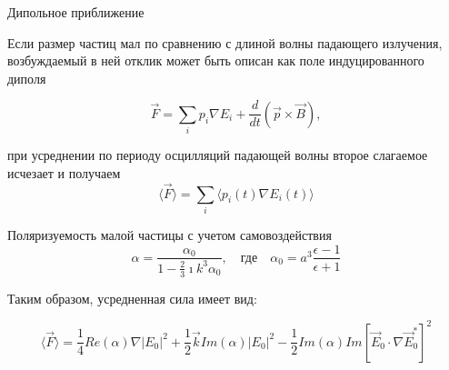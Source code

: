 \documentclass[9pt, compress, xcolor=table]{beamer}
\begin{document}
\begin{frame}{Дипольное приближение}

Если размер частиц мал по сравнению с длиной волны падающего излучения, возбуждаемый в ней отклик может быть описан как поле индуцированного диполя 

\begin{equation*}
\vec  F =\sum_i p_i \nabla E_i+\frac{d}{dt} (\vec p \times \vec B),
\end{equation*}

при усреднении по периоду осцилляций падающей волны второе слагаемое исчезает и получаем 
\begin{equation*}
\langle\vec  F \rangle= \sum_i \langle p_i(t) \nabla E_i(t) \rangle
\end{equation*}

Поляризуемость малой частицы с учетом самовоздействия
\begin{equation*}
\alpha=\frac{\alpha_0}{1-\frac{2}{3}\imath k^3\alpha_0},\quad\text{где}\quad\alpha_0 = a^3\frac{\epsilon-1}{\epsilon+1}
\end{equation*}

Таким образом, усредненная сила имеет вид:

\begin{equation*}
\boxed{
\langle\vec  F \rangle = \frac{1}{4} Re(\alpha) \nabla \left| E_0 \right|^2+\frac{1}{2} \vec k Im(\alpha) \left| E_0 \right|^2-\frac{1}{2} Im(\alpha) Im\left[\vec E_0 \cdot \nabla \vec E_0^*\right]^2
}
\end{equation*}

\end{frame}
\end{document}
